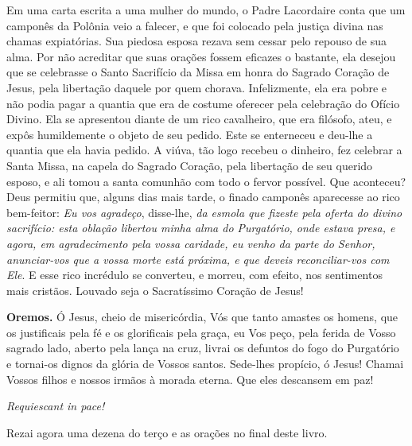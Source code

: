 Em uma carta escrita a uma mulher do mundo, o Padre Lacordaire conta que um camponês da Polônia veio a falecer, e que foi colocado pela justiça divina nas chamas expiatórias. Sua piedosa esposa rezava sem cessar pelo repouso de sua alma. Por não acreditar que suas orações fossem eficazes o bastante, ela desejou que se celebrasse o Santo Sacrifício da Missa em honra do Sagrado Coração de Jesus, pela libertação daquele por quem chorava. Infelizmente, ela era pobre e não podia pagar a quantia que era de costume oferecer pela celebração do Ofício Divino. Ela se apresentou diante de um rico cavalheiro, que era filósofo, ateu, e expôs humildemente o objeto de seu pedido. Este se enterneceu e deu-lhe a quantia que ela havia pedido. A viúva, tão logo recebeu o dinheiro, fez celebrar a Santa Missa, na capela do Sagrado Coração, pela libertação de seu querido esposo, e ali tomou a santa comunhão com todo o fervor possível. Que aconteceu? Deus permitiu que, alguns dias mais tarde, o finado camponês aparecesse ao rico bem-feitor: \textit{Eu vos agradeço}, disse-lhe, \textit{da esmola que fizeste pela oferta do divino sacrifício: esta oblação libertou minha alma do Purgatório, onde estava presa, e agora, em agradecimento pela vossa caridade, eu venho da parte do Senhor, anunciar-vos que a vossa morte está próxima, e que deveis reconciliar-vos com Ele}. E esse rico incrédulo se converteu, e morreu, com efeito, nos sentimentos mais cristãos. Louvado seja o Sacratíssimo Coração de Jesus!


\vspace{\baselineskip}\noindent \textbf{Oremos.} Ó Jesus, cheio de misericórdia, Vós que tanto amastes os homens, que os justificais pela fé e os glorificais pela graça, eu Vos peço, pela ferida de Vosso sagrado lado, aberto pela lança na cruz, livrai os defuntos do fogo do Purgatório e tornai-os dignos da glória de Vossos santos. Sede-lhes propício, ó Jesus! Chamai Vossos filhos e nossos irmãos à morada eterna. Que eles descansem em paz!


\begin{center}
\textit{Requiescant in pace!}
\end{center}

Rezai agora uma dezena do terço e as orações no final deste livro.
